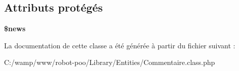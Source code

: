 \subsection*{Attributs protégés}
\begin{DoxyCompactItemize}
\item 
\hypertarget{class_library_1_1_entities_1_1_commentaire_a5859ed8a4fb4033790869e605c6a8854}{{\bfseries \$news}}\label{class_library_1_1_entities_1_1_commentaire_a5859ed8a4fb4033790869e605c6a8854}

\end{DoxyCompactItemize}


La documentation de cette classe a été générée à partir du fichier suivant \+:\begin{DoxyCompactItemize}
\item 
C\+:/wamp/www/robot-\/poo/\+Library/\+Entities/Commentaire.\+class.\+php\end{DoxyCompactItemize}
